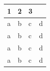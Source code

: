 \documentclass[11pt,a4paper]{article}
\begin{document}
\begin{table}[h]
\begin{tabular}{|l|l|l|l|}
\hline
1 & 2 & 3 &  \\ \hline
a & b & c & d \\ \hline
a & b & c & d \\ \hline
a & b & c & d \\ \hline
a & b & c & d \\ \hline
\end{tabular}
\end{table}
\end{document}
